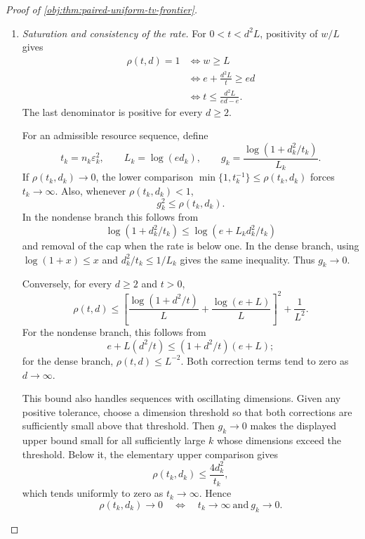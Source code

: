 \documentclass[11pt]{article}
\begin{document}
\begin{proof}[Proof of \cref{obj:thm:paired-uniform-tv-frontier}]
\begin{enumerate}
The protocol inclusion in \cref{obj:def:tv-private-decision-values} gives
\[
\mathfrak R^{\mathrm{TV}}_{\mathrm{SI}}
(\mathcal P_d^{\mathrm{pair}};n,d,\varepsilon)
\le
\mathfrak R^{\mathrm{TV}}_{\mathrm{NI}}
(\mathcal P_d^{\mathrm{pair}};n,d,\varepsilon),
\]
and the corresponding inequality for honest length.
The common bounds make all four values finite and strictly positive.
For risk, they also give
\[
\mathfrak R^{\mathrm{TV}}_{\mathrm{NI}}
(\mathcal P_d^{\mathrm{pair}};n,d,\varepsilon)
\le C_0\rho(t,d)
=\frac{C_0}{c}\,c\rho(t,d)
\le\frac{C_0}{c}
\mathfrak R^{\mathrm{TV}}_{\mathrm{SI}}
(\mathcal P_d^{\mathrm{pair}};n,d,\varepsilon).
\]
Dividing by the positive SI value yields the asserted risk ratio bounds.
Replacing \(\rho(t,d)\) by \(\sqrt{\rho(t,d)}\) proves the same ratio bounds for honest length.

\item \textit{Saturation and consistency of the rate.}
For \(0<t<d^2L\), positivity of \(w/L\) gives
\[
\begin{aligned}
\rho(t,d)=1
&\Longleftrightarrow w\ge L\\
&\Longleftrightarrow e+\frac{d^2L}{t}\ge ed\\
&\Longleftrightarrow
t\le\frac{d^2L}{ed-e}.
\end{aligned}
\]
The last denominator is positive for every \(d\ge2\).

For an admissible resource sequence, define
\[
t_k=n_k\varepsilon_k^2,\qquad
L_k=\log(ed_k),\qquad
g_k=\frac{\log(1+d_k^2/t_k)}{L_k}.
\]
If \(\rho(t_k,d_k)\to0\), the lower comparison
\(\min\{1,t_k^{-1}\}\le\rho(t_k,d_k)\) forces \(t_k\to\infty\).
Also, whenever \(\rho(t_k,d_k)<1\),
\[
g_k^2\le\rho(t_k,d_k).
\]
In the nondense branch this follows from
\[
\log(1+d_k^2/t_k)
\le\log(e+L_kd_k^2/t_k)
\]
and removal of the cap when the rate is below one.
In the dense branch, using \(\log(1+x)\le x\) and
\(d_k^2/t_k\le1/L_k\) gives the same inequality.
Thus \(g_k\to0\).

Conversely, for every \(d\ge2\) and \(t>0\),
\[
\rho(t,d)\le
\left[
\frac{\log(1+d^2/t)}{L}
+\frac{\log(e+L)}{L}
\right]^2+\frac1{L^2}.
\]
For the nondense branch, this follows from
\[
e+L(d^2/t)\le(1+d^2/t)(e+L);
\]
for the dense branch, \(\rho(t,d)\le L^{-2}\).
Both correction terms tend to zero as \(d\to\infty\).

This bound also handles sequences with oscillating dimensions.
Given any positive tolerance, choose a dimension threshold so that both corrections are sufficiently small above that threshold.
Then \(g_k\to0\) makes the displayed upper bound small for all sufficiently large \(k\) whose dimensions exceed the threshold.
Below it, the elementary upper comparison gives
\[
\rho(t_k,d_k)\le\frac{4d_k^2}{t_k},
\]
which tends uniformly to zero as \(t_k\to\infty\).
Hence
\[
\rho(t_k,d_k)\to0
\quad\Longleftrightarrow\quad
t_k\to\infty\ \text{and}\ g_k\to0.
\]


\end{enumerate}
\end{proof}
\end{document}
